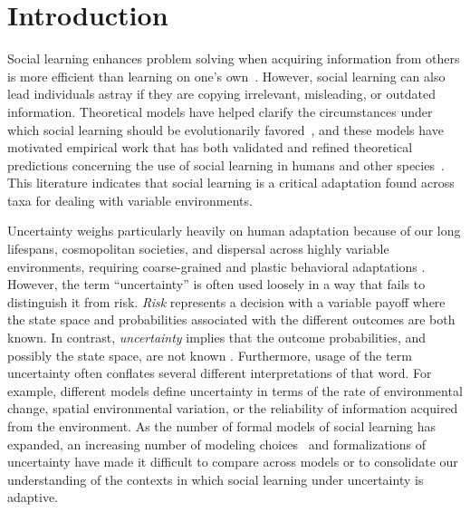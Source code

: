 \documentclass[letterpaper,11.5pt]{scrartcl}
\begin{document}
\section{Introduction}

Social learning enhances problem solving when acquiring information from others is more efficient than learning on one's own~\citep{Laland2004}. However, social learning can also lead individuals astray if they are copying irrelevant, misleading, or outdated information. Theoretical models have helped clarify the circumstances under which social learning should be evolutionarily favored~\citep{BoydRicherson1985, aoki2014evolution,Kendal2018}, and these models have motivated empirical work that has both validated and refined theoretical predictions concerning the use of social learning in humans and other species~\citep{galef2005social,McElreath2005,Kendal2018,Allen2019}. This literature
indicates that social learning is a critical adaptation found across taxa for dealing
with variable environments. %

Uncertainty weighs particularly heavily on human adaptation because of
our long lifespans, cosmopolitan societies, and dispersal across highly variable environments, requiring coarse-grained and plastic behavioral adaptations \citep{levins1962}. However, the term ``uncertainty'' is often used loosely in a way that fails to distinguish it from risk. \emph{Risk} represents a decision with a variable payoff where the state space and probabilities associated with the different outcomes are both known. In contrast, \emph{uncertainty} implies that the outcome probabilities, and possibly the state space, are not known \citep{knight1921, keynes1921}. Furthermore, usage of the term uncertainty often conflates several different interpretations of that word. For example, different models define uncertainty in terms of the rate of environmental change, spatial environmental variation, or the reliability of information acquired from the environment. %
As the number of formal models of social learning has expanded, an increasing number of modeling choices~\citep{Kendal2018} and formalizations of
uncertainty have made it difficult to compare across models or to consolidate our
understanding of the contexts in which social learning under uncertainty is adaptive. 
\end{document}
